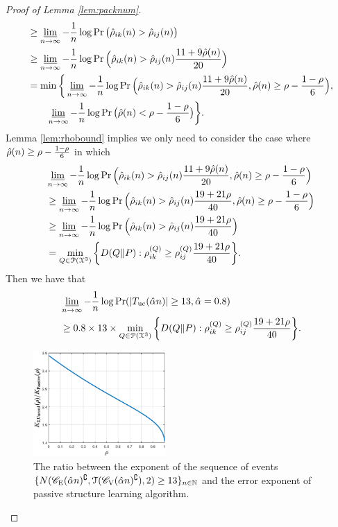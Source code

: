 \begin{proof}[Proof of Lemma \ref{lem:packnum}]
\begin{align}
		&\geq \varliminf_{n\rightarrow\infty}-\frac{1}{n}\log\Pr\big(\hat{\rho}_{ik}( n)>\hat{\rho}_{ij}( n)\big)\\
		&\geq \varliminf_{n\rightarrow\infty}-\frac{1}{n}\log\Pr\Big(\hat{\rho}_{ik}( n)>\hat{\rho}_{ij}( n)\frac{11+9\hat{\rho}( n)}{20}\Big)\\
		&=\min \bigg\{\varliminf_{n\rightarrow\infty}-\frac{1}{n}\log\Pr\Big(\hat{\rho}_{ik}( n)>\hat{\rho}_{ij}( n)\frac{11+9\hat{\rho}( n)}{20},\hat{\rho}(n)\geq \rho-\frac{1-\rho}{6}\Big),\nonumber\\
		&\qquad \varliminf_{n\rightarrow\infty}-\frac{1}{n}\log\Pr\big(\hat{\rho}(n)< \rho-\frac{1-\rho}{6}\big)\bigg\}.
	\end{align}
	Lemma \ref{lem:rhobound} implies we only need to consider the case where $\hat{\rho}(n)\geq \rho-\frac{1-\rho}{6}$ in which 
	\begin{align}
		&\varliminf_{n\rightarrow\infty}-\frac{1}{n}\log\Pr\Big(\hat{\rho}_{ik}(n)>\hat{\rho}_{ij}(n)\frac{11+9\hat{\rho}(n)}{20},\hat{\rho}(n)\geq \rho-\frac{1-\rho}{6}\Big)\nonumber\\
		&\geq \varliminf_{n\rightarrow\infty}-\frac{1}{n}\log\Pr\Big(\hat{\rho}_{ik}(n)>\hat{\rho}_{ij}(n)\frac{19+21\rho}{40},\hat{\rho}(n)\geq \rho-\frac{1-\rho}{6}\Big)\\
		&\geq \varliminf_{n\rightarrow\infty}-\frac{1}{n}\log\Pr\Big(\hat{\rho}_{ik}(n)>\hat{\rho}_{ij}(n)\frac{19+21\rho}{40}\Big)\\
		&= \min_{Q\in\mathcal{P}(\mathcal{X}^{3})}\bigg\{D(Q\|P):\rho_{ik}^{(Q)}\geq\rho_{ij}^{(Q)}\frac{19+21\rho}{40}\bigg\}.
	\end{align}
	Then we have that
	\begin{align}
		&\varliminf_{n\rightarrow\infty}-\frac{1}{n}\log\Pr(|T_{{\rm uc}}(\hat{\alpha} n)|\geq 13,\hat{\alpha}=0.8)\nonumber\\
		&\geq 0.8\times 13\times\min_{Q\in\mathcal{P}(\mathcal{X}^{3})}\bigg\{D(Q\|P):\rho_{ik}^{(Q)}\geq\rho_{ij}^{(Q)}\frac{19+21\rho}{40}\bigg\}.
	\end{align}
	\begin{figure}[t] 
		\centering 
		\includegraphics[width=0.45\textwidth]{unconfidetriple.eps} 
		\caption{The ratio between the exponent of the sequence of events $\{N(\mathscr{C}_{\mathrm{E}}(\hat{\alpha} n)^{\complement},\mathcal{T}(\mathscr{C}_{\mathrm{V}}(\hat{\alpha} n)^{\complement}),2)\geq 13\}_{n\in\mathbb{N}}$ and the error exponent of passive structure learning algorithm.} 
		\label{fig:unconfide_tri} 
	\end{figure}
	

\end{proof}
